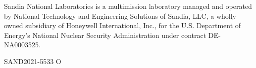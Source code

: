 \documentclass[letterpaper]{scrartcl}
\begin{document}
\vspace*{\fill}
\noindent
Sandia National Laboratories is a multimission laboratory managed and
operated by National Technology and Engineering Solutions of Sandia,
LLC, a wholly owned subsidiary of Honeywell International, Inc., for
the U.S. Department of Energy's National Nuclear Security
Administration under contract DE-NA0003525.

SAND2021-5533 O
\end{document}

